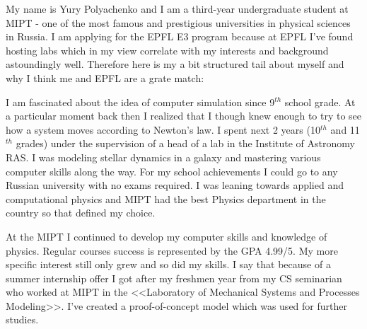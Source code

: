 \documentclass[11pt, a4paper]{awesome-cv}
\begin{document}
\begin{cvletter}


\hspace{10pt} My name is Yury Polyachenko and I am a third-year undergraduate student at MIPT - one of the most famous and prestigious universities in physical sciences in Russia. I am applying for the EPFL E3 program because at EPFL I've found hosting labs which in my view correlate with my interests and background astoundingly well. Therefore here is my a bit structured tail about myself and why I think me and EPFL are a grate match:

I am fascinated about the idea of computer simulation since 9$^{th}$ school grade. At a particular moment back then I realized that I though knew enough to try to see how a system moves according to Newton's law. I spent next 2 years (10$^{th}$ and 11$^{th}$ grades) under the supervision of a head of a lab in the Institute of Astronomy RAS. I was modeling stellar dynamics in a galaxy and mastering various computer skills along the way. For my school achievements I could go to any Russian university with no exams required. I was leaning towards applied and computational physics and MIPT had the best Physics department in the country so that defined my choice. 

At the MIPT I continued to develop my computer skills and knowledge of physics. Regular courses success is represented by the GPA 4.99/5. My more specific interest still only grew and so did my skills. I say that because of a summer internship offer I got after my freshmen year from my CS seminarian who worked at MIPT in the <<Laboratory of Mechanical Systems and Processes Modeling>>. I've created a proof-of-concept model which was used for further studies. 


\end{cvletter}
\end{document}

